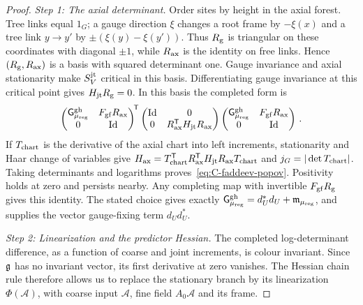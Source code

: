 \begin{proof}
\emph{Step 1: The axial determinant.}
Order sites by height in the axial forest. Tree links equal $1_G$; a gauge direction $\xi$ changes a root frame by $-\xi(x)$ and a tree link $y\to y'$ by $\pm(\xi(y)-\xi(y'))$. Thus $R_{\rm g}$ is triangular on these coordinates with diagonal $\pm1$, while $R_{\rm ax}$ is the identity on free links. Hence $(R_{\rm g},R_{\rm ax})$ is a basis with squared determinant one. Gauge invariance and axial stationarity make $S^{\rm jt}_V$ critical in this basis. Differentiating gauge invariance at this critical point gives $H_{\rm jt}R_{\rm g}=0$. In this basis the completed form is
\begin{equation*}
 \begin{pmatrix}\mathsf G^{\rm gh}_{\mu_{\rm reg}}&F_{\rm gf}R_{\rm ax}\\0&\mathrm{Id}\end{pmatrix}^{\!\mathsf T}
 \begin{pmatrix}\mathrm{Id}&0\\0&R_{\rm ax}^{\mathsf T}H_{\rm jt}R_{\rm ax}\end{pmatrix}
 \begin{pmatrix}\mathsf G^{\rm gh}_{\mu_{\rm reg}}&F_{\rm gf}R_{\rm ax}\\0&\mathrm{Id}\end{pmatrix}\,.
\end{equation*}
If $T_{\rm chart}$ is the derivative of the axial chart into left increments, stationarity and Haar change of variables give $H_{\rm ax}=T_{\rm chart}^{\mathsf T}R_{\rm ax}^{\mathsf T}H_{\rm jt}R_{\rm ax}T_{\rm chart}$ and $j_G=|\det T_{\rm chart}|$. Taking determinants and logarithms proves~\eqref{eq:C-faddeev-popov}. Positivity holds at zero and persists nearby. Any completing map with invertible $F_{\rm gf}R_{\rm g}$ gives this identity. The stated choice gives exactly $\mathsf G^{\rm gh}_{\mu_{\rm reg}}=d_U^*d_U+\mathfrak m_{\mu_{\rm reg}}$, and supplies the vector gauge-fixing term $d_Ud_U^*$.

\emph{Step 2: Linearization and the predictor Hessian.}
The completed log-determinant difference, as a function of coarse and joint increments, is colour invariant. Since $\mathfrak{g}$ has no invariant vector, its first derivative at zero vanishes. The Hessian chain rule therefore allows us to replace the stationary branch by its linearization $\Phi(\mathcal A)$, with coarse input $\mathcal A$, fine field $A_0\mathcal A$ and its frame.


\end{proof}
